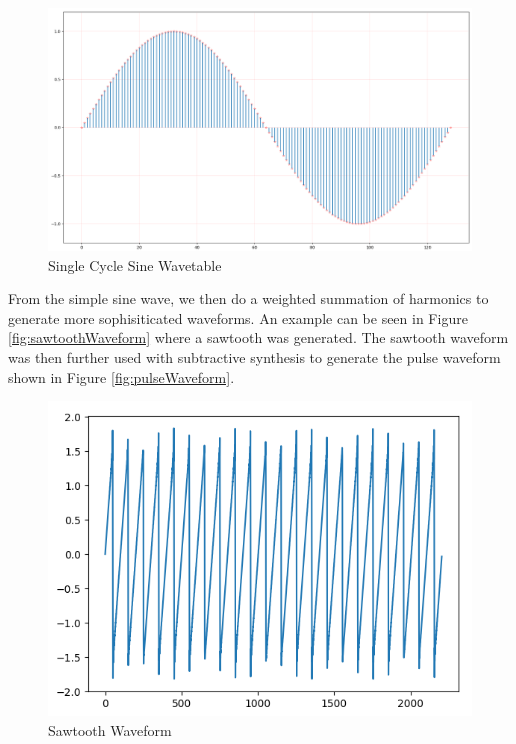 \documentclass[a0,portrait]{a0poster}
\begin{document}
\begin{sectbox}
\begin{figure}[H]
  \centering
  \begin{minipage}[b]{0.5\textwidth}
    \includegraphics[width=\textwidth]{wavetable.png}
    \caption{Single Cycle Sine Wavetable}
    \label{fig:sineWavetable}
  \end{minipage}
  \hfill
\end{figure}
From the simple sine wave, we then do a weighted summation of harmonics to generate more sophisiticated waveforms. An example can be seen in Figure \ref{fig:sawtoothWaveform} where a sawtooth was generated. The sawtooth waveform was then further used with subtractive synthesis to generate the pulse waveform shown in Figure \ref{fig:pulseWaveform}.
\begin{figure}[H]
  \centering
  \begin{minipage}[b]{0.45\textwidth}
    \includegraphics[width=\textwidth]{saw.png}
    \caption{Sawtooth Waveform}

\end{minipage}
\end{figure}
\end{sectbox}
\end{document}
